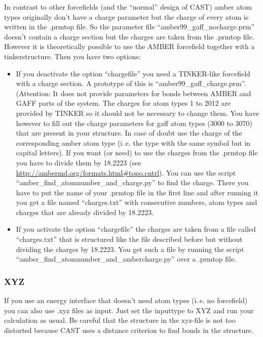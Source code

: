 \documentclass[10pt,a4paper]{article} %
\begin{document}
In contrast to other forcefields (and the ``normal'' design of CAST) amber atom types originally don't have a charge parameter but the charge of every atom is written in the .prmtop file. So the parameter file ``amber99\_gaff\_nocharge.prm'' doesn't contain a charge section but the charges are taken from the .prmtop file. However it is theoretically possible to use the AMBER forcefield together with a tinkerstructure. Then you have two options:
\begin{itemize}
\item If you deactivate the option ``chargefile'' you need a TINKER-like forcefield with a charge section. A prototype of this is ``amber99\_gaff\_charge.prm''. (Attention: It does not provide parameters for bonds between AMBER and GAFF parts of the system. The charges for atom types 1 to 2012 are provided by TINKER so it should not be necessary to change them. You have however to fill out the charge parameters for gaff atom types (3000 to 3070) that are present in your structure. In case of doubt use the charge of the corresponding amber atom type (i.\,e. the type with the same symbol but in capital letters). If you want (or need) to use the charges from the .prmtop file you have to divide them by 18.2223 (see \url{http://ambermd.org/formats.html\#topo.cntrl}). You can use the script ``amber\_find\_atomnumber\_and\_charge.py'' to find the charge. There you have to put the name of your .prmtop file in the first line and after running it you get a file named ``charges.txt'' with consecutive numbers, atom types and charges that are already divided by 18.2223.
\item If you activate the option ``chargefile'' the charges are taken from a file called ``charges.txt'' that is structured like the file described before but without dividing the charges by 18.2223. You get such a file by running the script ``amber\_find\_atomnumber\_and\_ambercharge.py'' over a .prmtop file.
\end{itemize}

\subsubsection{XYZ}

If you use an energy interface that doesn't need atom types (i.\,e. no forcefield) you can also use .xyz files as input. Just set the inputtype to XYZ and run your calculation as usual. Be careful that the structure in the xyz-file is not too distorted because CAST uses a distance criterion to find bonds in the structure.
\end{document}

